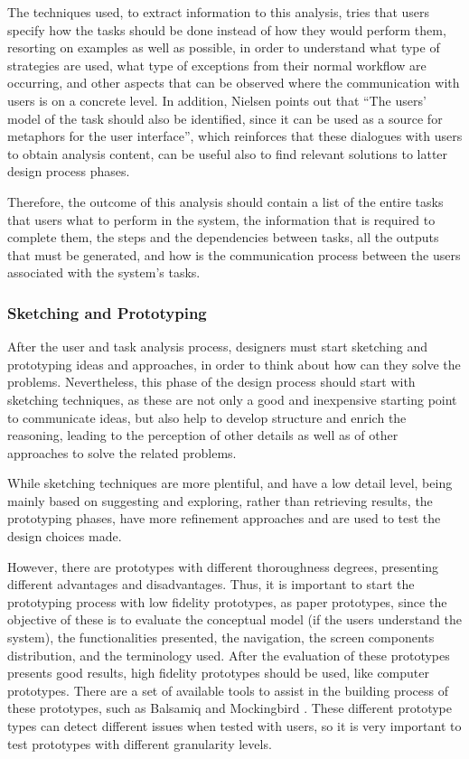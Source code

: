 The techniques used, to extract information to this analysis, tries that users specify how the tasks should be done instead of how they would perform them, resorting on examples as well as possible, in order to understand what type of strategies are used, what type of exceptions from their normal workflow are occurring, and other aspects that can be observed where the communication with users is on a concrete level. \cite{usabilityEngineering} In addition, Nielsen \cite{usabilityEngineering} points out that  “The users' model of the task should also be identified, since it can be used as a source for metaphors for the user interface”, which reinforces that these dialogues with users to obtain analysis content, can be useful also to find relevant solutions to latter design process phases.

Therefore, the outcome of this analysis should contain a list of the entire tasks that users what to perform in the system, the information that is required to complete them, the steps and the dependencies between tasks, all the outputs that must be generated, and how is the communication process between the users associated with the system’s tasks. \cite{usabilityEngineering}


\subsubsection{Sketching and Prototyping}
\label{subsubsec:sketching_and_prototyping}
After the user and task analysis process, designers must start sketching and prototyping ideas and approaches, in order to think about how can they solve the problems. Nevertheless, this phase of the design process should start with sketching techniques, as these are not only a good and inexpensive starting point to communicate ideas, but also help to develop structure and enrich the reasoning, leading to the perception of other details as well as of other approaches to solve the related problems.

While sketching techniques are more plentiful, and have a low detail level, being mainly based on suggesting and exploring, rather than retrieving results, the prototyping phases, have more refinement approaches and are used to test the design choices made.

However, there are prototypes with different thoroughness degrees, presenting different advantages and disadvantages. Thus, it is important to start the prototyping process with low fidelity prototypes, as paper prototypes, since the objective of these is to evaluate the conceptual model (if the users understand the system), the functionalities presented, the navigation, the screen components distribution, and the terminology used. After the evaluation of these prototypes presents good results, high fidelity prototypes should be used, like computer prototypes. There are a set of available tools to assist in the building process of these prototypes, such as Balsamiq \cite{balsamiq} and Mockingbird \cite{mockingbird}. These different prototype types can detect different issues when tested with users, so it is very important to test prototypes with different granularity levels.

